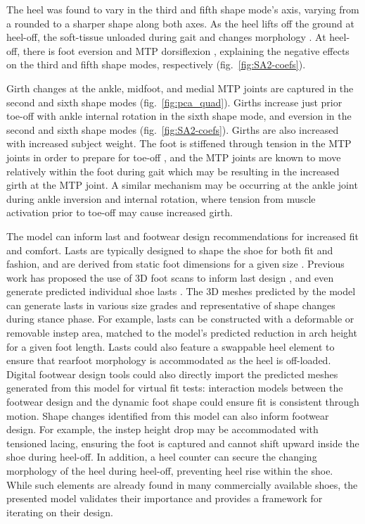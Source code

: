 \documentclass[defaultstyle,11pt]{comps}
\begin{document}
The heel was found to vary in the third and fifth shape mode's axis, varying from a rounded to a sharper shape along both axes.
As the heel lifts off the ground at heel-off, the soft-tissue unloaded during gait and changes morphology \citep{Fontanella2013}.
At heel-off, there is foot eversion and MTP dorsiflexion \citep{Leardini2007}, explaining the negative effects on the third and fifth shape modes, respectively (fig.~\ref{fig:SA2-coefs}).

Girth changes at the ankle, midfoot, and medial MTP joints are captured in the second and sixth shape modes (fig.~\ref{fig:pca_quad}).
Girths increase just prior toe-off with ankle internal rotation in the sixth shape mode, and eversion in the second and sixth shape modes (fig.~\ref{fig:SA2-coefs}).
Girths are also increased with increased subject weight.
The foot is stiffened through tension in the MTP joints in order to prepare for toe-off \citep{Hicks1954}, and the MTP joints are known to move relatively within the foot during gait \citep{Wolf2008, Lundgren2008} which may be resulting in the increased girth at the MTP joint.
A similar mechanism may be occurring at the ankle joint during ankle inversion and internal rotation, where tension from muscle activation prior to toe-off may cause increased girth.

The model can inform last and footwear design recommendations for increased fit and comfort.
Lasts are typically designed to shape the shoe for both fit and fashion, and are derived from static foot dimensions for a given size \citep{Luximon2013}.
Previous work has proposed the use of 3D foot scans to inform last design \citep{Sambhav2011}, and even generate predicted individual shoe lasts \citep{Amza2019}.
The 3D meshes predicted by the model can generate lasts in various size grades and representative of shape changes during stance phase.
For example, lasts can be constructed with a deformable or removable instep area, matched to the model's predicted reduction in arch height for a given foot length.
Lasts could also feature a swappable heel element to ensure that rearfoot morphology is accommodated as the heel is off-loaded.
Digital footwear design tools could also directly import the predicted meshes generated from this model for virtual fit tests: interaction models between the footwear design and the dynamic foot shape could ensure fit is consistent through motion.
Shape changes identified from this model can also inform footwear design.
For example, the instep height drop may be accommodated with tensioned lacing, ensuring the foot is captured and cannot shift upward inside the shoe during heel-off.
In addition, a heel counter can secure the changing morphology of the heel during heel-off, preventing heel rise within the shoe.
While such elements are already found in many commercially available shoes, the presented model validates their importance and provides a framework for iterating on their design.
\end{document}
